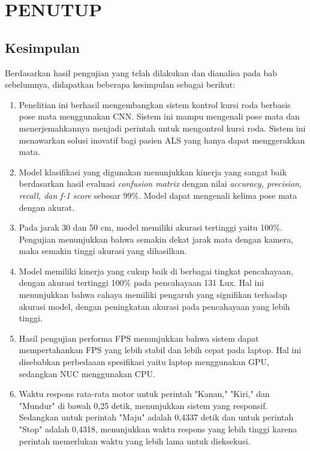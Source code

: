 \chapter{PENUTUP}
\label{chap:penutup}


\section{Kesimpulan}
\label{sec:kesimpulan}

Berdasarkan hasil pengujian yang telah dilakukan dan dianalisa pada bab sebelumnya, didapatkan beberapa kesimpulan sebagai berikut:

\begin{enumerate}[nolistsep]

  \item Penelitian ini berhasil mengembangkan sistem kontrol kursi roda berbasis pose mata menggunakan CNN. Sistem ini mampu mengenali pose mata dan menerjemahkannya menjadi perintah untuk mengontrol kursi roda. Sistem ini menawarkan solusi inovatif bagi pasien ALS yang hanya dapat menggerakkan mata.

  \item Model klasifikasi yang digunakan menunjukkan kinerja yang sangat baik berdasarkan hasil evaluasi \emph{confusion matrix} dengan nilai \emph{accuracy, precision, recall, dan f-1 score} sebesar 99\%. Model dapat mengenali kelima pose mata dengan akurat.

  \item Pada jarak 30 dan 50 cm, model memiliki akurasi tertinggi yaitu 100\%. Pengujian menunjukkan bahwa semakin dekat jarak mata dengan kamera, maka semakin tinggi akurasi yang dihasilkan.
  
  \item Model memiliki kinerja yang cukup baik di berbagai tingkat pencahayaan, dengan akurasi tertinggi 100\% pada pencahayaan 131 Lux. Hal ini menunjukkan bahwa cahaya memiliki pengaruh yang signifikan terhadap akurasi model, dengan peningkatan akurasi pada pencahayaan yang lebih tinggi.
  
  \item Hasil pengujian performa FPS menunjukkan bahwa sistem dapat mempertahankan FPS yang lebih stabil dan lebih cepat pada laptop. Hal ini disebabkan perbedaaan spesifikasi yaitu laptop menggunakan GPU, sedangkan NUC menggunakan CPU.

  \item Waktu respons rata-rata motor untuk perintah "Kanan," "Kiri," dan "Mundur" di bawah 0,25 detik, menunjukkan sistem yang responsif. Sedangkan untuk perintah "Maju" adalah 0,4337 detik dan untuk perintah "Stop" adalah 0,4318, menunjukkan waktu respons yang lebih tinggi karena perintah memerlukan waktu yang lebih lama untuk dieksekusi.
  

\end{enumerate}

